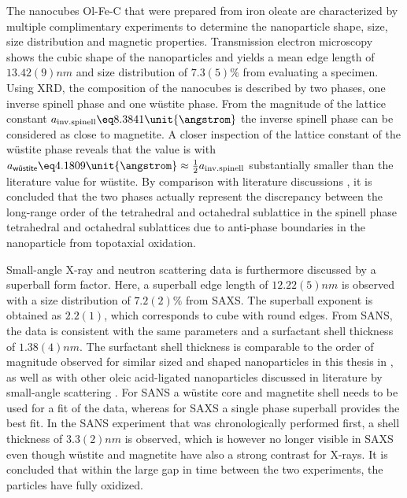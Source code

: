 \documentclass[\main/dresen_thesis.tex]{subfiles}
\begin{document}
  \label{sec:colloidalCrystals:nanoparticle:summary}
  The nanocubes Ol-Fe-C that were prepared from iron oleate are characterized by multiple complimentary experiments to determine the nanoparticle shape, size, size distribution and magnetic properties.
  Transmission electron microscopy shows the cubic shape of the nanoparticles and yields a mean edge length of $13.42(9) \unit{nm}$ and size distribution of $7.3(5) \%$ from evaluating a specimen.
  Using XRD, the composition of the nanocubes is described by two phases, one inverse spinell phase and one w\"ustite phase.
  From the magnitude of the lattice constant $a_\mathrm{inv. spinell} \eq 8.3841 \unit{\angstrom}$ the inverse spinell phase can be considered as close to magnetite.
  A closer inspection of the lattice constant of the w\"ustite phase reveals that the value is with $a_\textsf{w\"ustite} \eq 4.1809 \unit{\angstrom} \approx \tfrac{1}{2} a_\mathrm{inv. spinell}$ substantially smaller than the literature value for w\"ustite.
  By comparison with literature discussions \cite{Wetterskog_2013_Anoma}, it is concluded that the two phases actually represent the discrepancy between the long-range order of the tetrahedral and octahedral sublattice in the spinell phase tetrahedral and octahedral sublattices due to anti-phase boundaries in the nanoparticle from topotaxial oxidation.

  Small-angle X-ray and neutron scattering data is furthermore discussed by a superball form factor.
  Here, a superball edge length of $12.22(5) \unit{nm}$ is observed with a size distribution of $7.2(2) \%$ from SAXS.
  The superball exponent is obtained as $2.2(1)$, which corresponds to cube with round edges.
  From SANS, the data is consistent with the same parameters and a surfactant shell thickness of $1.38(4) \unit{nm}$.
  The surfactant shell thickness is comparable to the order of magnitude observed for similar sized and shaped nanoparticles in this thesis in , as well as with other oleic acid-ligated nanoparticles discussed in literature by small-angle scattering \cite{Disch_2012_Quant}.
  For SANS a w\"ustite core and magnetite shell needs to be used for a fit of the data, whereas for SAXS a single phase superball provides the best fit.
  In the SANS experiment that was chronologically performed first, a shell thickness of $3.3(2) \unit{nm}$ is observed, which is however no longer visible in SAXS even though w\"ustite and magnetite have also a strong contrast for X-rays.
  It is concluded that within the large gap in time between the two experiments, the particles have fully oxidized.
  \\
\end{document}

